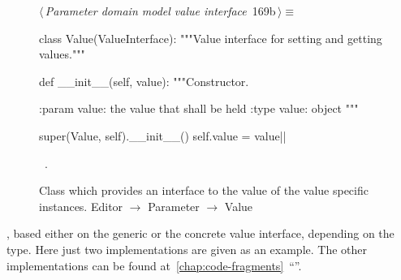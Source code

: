 \documentclass[%
    a4paper,    %
    justified,  %
    nobib,      %
    openany     %
]{tufte-book}
\makeatletter
\renewcommand{\label}[1]{\@tufte@label{##1}}%
\makeatother
\begin{document}
\begin{figure}[!htbp]
\begin{flushleft} \small
\begin{minipage}{\linewidth}\label{scrap137}\raggedright\small
{} $\langle\,${\itshape Parameter domain model value interface}\nobreak\ {\footnotesize {169b}}$\,\rangle\equiv$
\vspace{-1ex}
\begin{pythoncode}
class Value(ValueInterface):
    """Value interface for setting and getting values."""

    def __init__(self, value):
        """Constructor.

        :param value: the value that shall be held
        :type  value: object
        """

        super(Value, self).__init__()
        self.value = value|\NWsep|
\end{pythoncode}
\vspace{1.5ex}
\footnotesize
\begin{list}{}{\setlength{\itemsep}{-\parsep}\setlength{\itemindent}{-\leftmargin}}
\item \NWtxtMacroRefIn\ .

\item{}
\end{list}
\end{minipage}\vspace{4ex}
\end{flushleft}
\caption{Class which provides an interface to the value of the value specific
  instances.
  \newline{}\newline{}Editor $\rightarrow$ Parameter $\rightarrow$
  Value}
\end{figure}

, based either on the
generic or the concrete value interface, depending on the type. Here just two
implementations are given as an example. The other implementations can be found
at~\autoref{chap:code-fragments}~\enquote{}.
\end{document}
